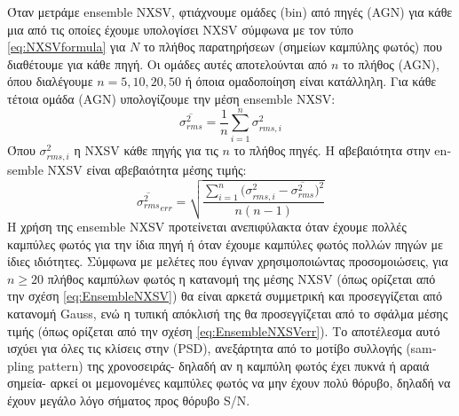 Όταν μετράμε \textlatin{ensemble NXSV}, φτιάχνουμε ομάδες \textlatin{(bin)} από πηγές \textlatin{(AGN)} για κάθε μια από τις οποίες έχουμε υπολογίσει \textlatin{NXSV} σύμφωνα με τον τύπο \ref{eq:NXSVformula} για $N$ το πλήθος παρατηρήσεων (σημείων καμπύλης φωτός) που διαθέτουμε για κάθε πηγή. Οι ομάδες αυτές αποτελούνται από $n$ το πλήθος \textlatin{(AGN)}, όπου διαλέγουμε $n = 5, 10, 20, 50$ ή όποια ομαδοποίηση είναι κατάλληλη. Για κάθε τέτοια ομάδα \textlatin{(AGN)}  υπολογίζουμε την μέση \textlatin{ensemble NXSV}:
\begin{equation} \overline{\sigma^2_{rms}} = \frac{1}{n} \sum_{i=1}^n \sigma^2_{rms, i} \label{eq:EnsembleNXSV} \end{equation}
Όπου $\sigma^2_{rms, i}$ η \textlatin{NXSV} κάθε πηγής για τις $n$ το πλήθος πηγές. Η αβεβαιότητα στην \textlatin{ensemble NXSV} είναι αβεβαιότητα μέσης τιμής\cite{2013ApJ...771....9A}: 
\begin{equation} \overline{\sigma^2_{rms}}_{err} =\sqrt{  \dfrac{\sum_{i=1}^n \big(\sigma^2_{rms, i} - \overline{\sigma^2_{rms}} \big)^2  }{n(n-1)} } \label{eq:EnsembleNXSVerr} \end{equation}
Η χρήση της \textlatin{ensemble NXSV} προτείνεται ανεπιφύλακτα \cite{2013ApJ...771....9A} όταν έχουμε πολλές καμπύλες φωτός για την ίδια πηγή ή όταν έχουμε καμπύλες φωτός πολλών πηγών με ίδιες ιδιότητες. Σύμφωνα με μελέτες που έγιναν χρησιμοποιώντας προσομοιώσεις\cite{2013ApJ...771....9A}, για $n \geq 20$ πλήθος καμπύλων φωτός η κατανομή της μέσης \textlatin{NXSV} (όπως ορίζεται από την σχέση \ref{eq:EnsembleNXSV}) θα είναι αρκετά συμμετρική και προσεγγίζεται από κατανομή \textlatin{Gauss}, ενώ η τυπική απόκλισή της θα προσεγγίζεται από το σφάλμα μέσης τιμής (όπως ορίζεται από την σχέση \ref{eq:EnsembleNXSVerr}). Το αποτέλεσμα αυτό ισχύει για όλες τις κλίσεις στην \textlatin{(PSD)}, ανεξάρτητα από το μοτίβο συλλογής \textlatin{(sampling pattern)} της χρονοσειράς- δηλαδή αν η καμπύλη φωτός έχει πυκνά ή αραιά σημεία- αρκεί οι μεμονομένες καμπύλες φωτός να μην έχουν πολύ θόρυβο, δηλαδή να έχουν μεγάλο λόγο σήματος προς θόρυβο \textlatin{S/N}\cite{2013ApJ...771....9A}.

